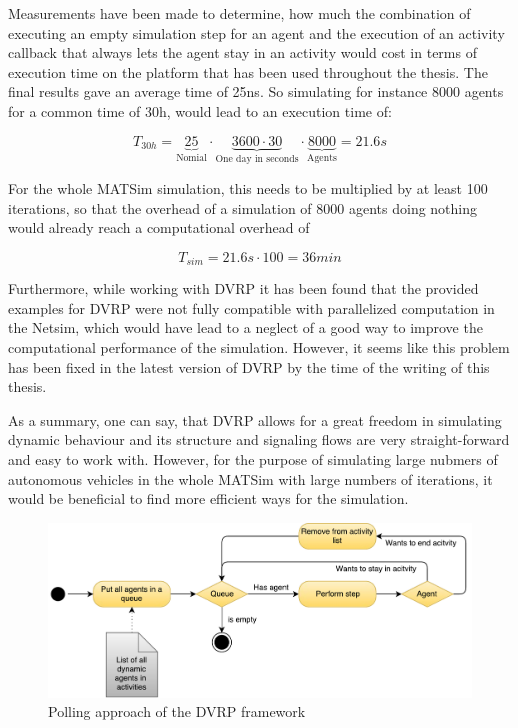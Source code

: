 Measurements have been made to determine, how much the combination of executing
an empty simulation step for an agent and the execution of an activity callback
that always lets the agent stay in an activity would cost in terms of execution
time on the platform that has been used throughout the thesis. The final results
gave an average time of 25ns. So simulating for instance 8000 agents for a common
time of 30h, would lead to an execution time of:

\begin{equation}
T_{30h} = \underbrace{25}_{\text{Nomial}} \cdot \underbrace{3600 \cdot 30}_{\text{One day in seconds}} \cdot \underbrace{8000}_{\text{Agents}} = 21.6s
\end{equation}

For the whole MATSim simulation, this needs to be multiplied by at least 100 iterations,
so that the overhead of a simulation of 8000 agents doing nothing would already
reach a computational overhead of

\begin{equation}
T_{sim} = 21.6s \cdot 100 = 36min
\end{equation}

Furthermore, while working with DVRP it has been found that the provided examples
for DVRP were not fully compatible with parallelized computation in the Netsim,
which would have lead to a neglect of a good way to improve the computational
performance of the simulation. However, it seems like this problem has been fixed
in the latest version of DVRP by the time of the writing of this thesis.

As a summary, one can say, that DVRP allows for a great freedom in simulating
dynamic behaviour and its structure and signaling flows are very straight-forward
and easy to work with. However, for the purpose of simulating large nubmers of
autonomous vehicles in the whole MATSim with large numbers of iterations, it would
be beneficial to find more efficient ways for the simulation.

\begin{figure}
    \centering
    \includegraphics[width=1.0\textwidth]{figures/polling.pdf}
    \caption{Polling approach of the DVRP framework}
    \label{fig:polling}
\end{figure}

